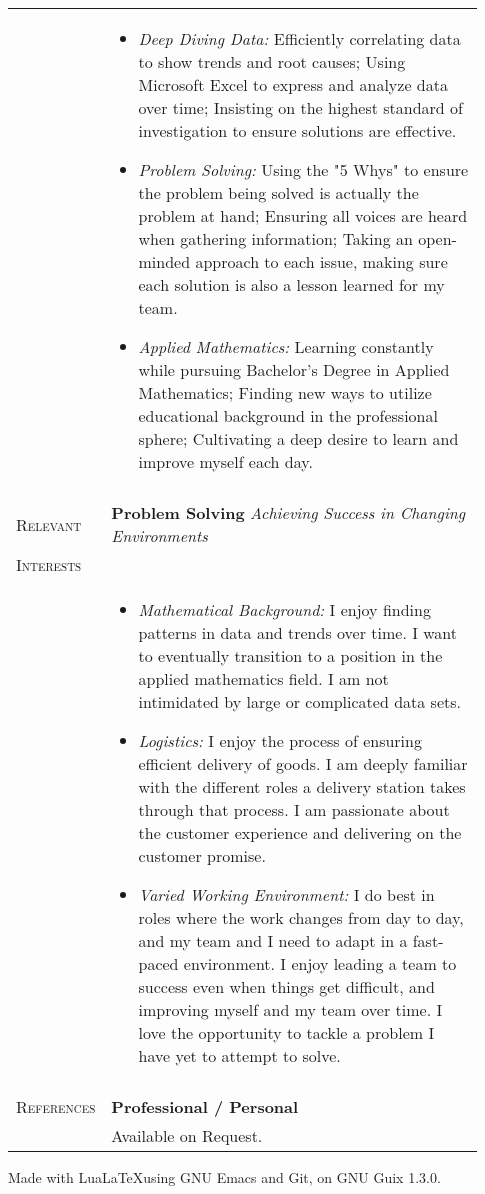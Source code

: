 \documentclass[letterpaper, 10pt, oneside]{article}
\newcommand{\stitle}[1]{\normalsize{\textsc{#1}}}
\newcommand{\bdit}[1]{{\textbf{#1}}}
\begin{document}
\begin{longtable}{@{} p{0.13\linewidth} p{0.8\linewidth}}
  & \parbox{0.8\textwidth}{\begin{itemize}
    \item{\textsl{Deep Diving Data:} Efficiently correlating data to show
        trends and root causes; Using Microsoft Excel to express and analyze
        data over time; Insisting on the highest standard of investigation to
        ensure solutions are effective.}
    \item{\textsl{Problem Solving:} Using the "5 Whys" to ensure the
        problem being solved is actually the problem at hand; Ensuring all
        voices are heard when gathering information; Taking an open-minded
        approach to each issue, making sure each solution is also a lesson
        learned for my team.}
    \item{\textsl{Applied Mathematics:} Learning constantly while pursuing
        Bachelor's Degree in Applied Mathematics; Finding new ways to utilize
        educational background in the professional sphere; Cultivating a deep
        desire to learn and improve myself each day.}
    \end{itemize}}
  \\
  \\
  \stitle{Relevant} & \bdit{Problem Solving}
  \hfill   \textsl{Achieving Success in Changing Environments} \\
  \stitle{Interests} & \\[-1.75em]
  & \parbox{0.8\textwidth}{\begin{itemize}
      
    \item{\textsl{Mathematical Background:} I enjoy finding patterns in data
        and trends over time. I want to eventually transition to a position
        in the applied mathematics field. I am not intimidated by large or
        complicated data sets.}
    \item{\textsl{Logistics:} I enjoy the process of ensuring efficient
        delivery of goods. I am deeply familiar with the different roles a
        delivery station takes through that process. I am passionate about
        the customer experience and delivering on the customer promise.}
    \item{\textsl{Varied Working Environment:} I do best in roles where the
        work changes from day to day, and my team and I need to adapt in a
        fast-paced environment. I enjoy leading a team to success even when
        things get difficult, and improving myself and my team over time. I
        love the opportunity to tackle a problem I have yet to attempt to
        solve.}
    \end{itemize}}
  \\
  \\
  \stitle{References} & \bdit{Professional / Personal}
  \hfill  \\
  & Available on Request.
\end{longtable}
\vspace*{\fill}
\begin{center}
  \tiny Made with Lua\LaTeX using GNU Emacs and Git, on GNU Guix 1.3.0.
\end{center}
\end{document}
